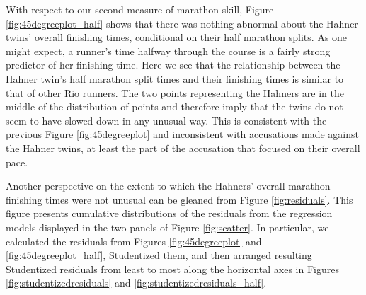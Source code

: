 \documentclass[12pt,titlepage]{article}
\begin{document}
With respect to our second measure of marathon skill, Figure
\ref{fig:45degreeplot_half} shows that there was nothing abnormal
about the Hahner twins' overall finishing times, conditional on their
half marathon splits. As one might expect, a runner's time halfway
through the course is a fairly strong predictor of her finishing time.
Here we see that the relationship between the Hahner twin's half
marathon split times and their finishing times is similar to that of
other Rio runners.  The two points representing the Hahners are in the
middle of the distribution of points and therefore imply that the
twins do not seem to have slowed down in any unusual way.  This is
consistent with the previous Figure \ref{fig:45degreeplot} and
inconsistent with accusations made against the Hahner twins, at least
the part of the accusation that focused on their overall pace.

Another perspective on the extent to which the Hahners' overall
marathon finishing times were not unusual can be gleaned from Figure
\ref{fig:residuals}.  This figure presents cumulative distributions of
the residuals from the regression models displayed in the two panels
of Figure \ref{fig:scatter}.  In particular, we calculated the
residuals from Figures \ref{fig:45degreeplot} and
\ref{fig:45degreeplot_half}, Studentized them, and then arranged
resulting Studentized residuals from least to most along the
horizontal axes in Figures \ref{fig:studentizedresiduals} and
\ref{fig:studentizedresiduals_half}.\label{residualplots}
\end{document}
